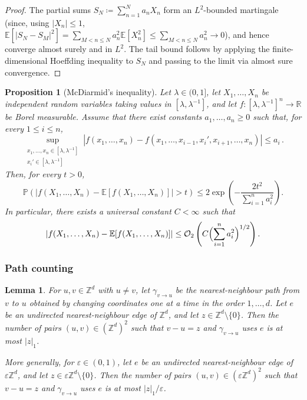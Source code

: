 \documentclass[11pt]{amsart}
\theoremstyle{plain}
\newtheorem{proposition}[theorem]{Proposition}
\newtheorem{lemma}[theorem]{Lemma}
\theoremstyle{definition}
\theoremstyle{remark}
\newcommand{\E}{\mathbb{E}}
\newcommand{\Zd}{\mathbb{Z}^d}
\newcommand{\R}{\mathbb{R}}
\newcommand{\eps}{\varepsilon}
\renewcommand{\P}{\mathbb{P}}
\begin{document}
	\begin{proof}
		The partial sums $S_N \coloneqq \sum_{n=1}^N a_n X_n$ form an $L^2$-bounded martingale (since, using $|X_n| \le 1$, $\E[|S_N - S_M|^2] = \sum_{M < n \le N} a_n^2 \E[X_n^2] \le \sum_{M < n \le N} a_n^2 \to 0$), and hence converge almost surely and in $L^2$.
		The tail bound follows by applying the finite-dimensional Hoeffding inequality to $S_N$ and passing to the limit via almost sure convergence.
	\end{proof}
	
	\begin{proposition}[McDiarmid's inequality] \label{prop.McDiarmid}
		Let $\lambda \in (0,1]$, let $X_1, \ldots, X_n$ be independent random variables taking values in $[\lambda, \lambda^{-1}]$, and let $f : [\lambda, \lambda^{-1}]^n \to \R$ be Borel measurable.
		Assume that there exist constants $a_1, \ldots, a_n \ge 0$ such that, for every $1 \le i \le n$,
		\[
		\sup_{\substack{x_1, \ldots, x_n \in [\lambda, \lambda^{-1}] \\ x_i' \in [\lambda, \lambda^{-1}]}} \left| f(x_1, \ldots, x_n) - f(x_1, \ldots, x_{i-1}, x_i', x_{i+1}, \ldots, x_n) \right| \le a_i\,.
		\]
		Then, for every $t > 0$,
		\[
		\P\left( \left| f(X_1, \ldots, X_n) - \E[f(X_1, \ldots, X_n)] \right| > t \right) \le 2\exp\left( -\frac{2t^2}{\sum_{i=1}^n a_i^2} \right).
		\]
		In particular, there exists a universal constant $C < \infty$ such that
		\[
		\left| f(X_1, \ldots, X_n) - \E[f(X_1, \ldots, X_n)] \right| \le \mathcal{O}_2\left( C\Bigl(\sum_{i=1}^n a_i^2\Bigr)^{1/2} \right).
		\]
	\end{proposition}
	
	
	\subsubsection{Path counting} \label{sec:pathcounting}
	
	
	\begin{lemma}
		\label{l.path}
		For $u, v \in \Zd$ with $u \ne v$, let $\gamma_{v \to u}$ be the nearest-neighbour path from $v$ to $u$ obtained by changing coordinates one at a time in the order $1, \ldots, d$.
		Let $e$ be an undirected nearest-neighbour edge of $\Zd$, and let $z \in \Zd \setminus \{0\}$.
		Then the number of pairs $(u,v) \in (\Zd)^2$ such that $v - u = z$ and $\gamma_{v \to u}$ uses $e$ is at most $|z|_1$.
		
		More generally, for $\eps \in (0,1)$, let $e$ be an undirected nearest-neighbour edge of $\eps\Zd$, and let $z \in \eps\Zd \setminus \{0\}$.
		Then the number of pairs $(u,v) \in (\eps\Zd)^2$ such that $v - u = z$ and $\gamma_{v \to u}$ uses $e$ is at most $|z|_1/\eps$.
	\end{lemma}
	
\end{document}
